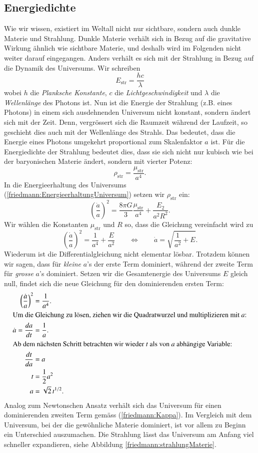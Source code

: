 \begin{refsection}
\subsection*{Energiedichte}
Wie wir wissen, existiert im Weltall nicht nur sichtbare, sondern auch dunkle Materie und Strahlung. Dunkle Materie verhält sich in Bezug auf die gravitative Wirkung ähnlich wie sichtbare Materie, und deshalb wird im Folgenden nicht weiter darauf eingegangen.
Anders verhält es sich mit der Strahlung in Bezug auf die Dynamik des Universums. Wir schreiben
\[ E_\text{str} = \frac{h c}{\lambda} \]
wobei $h$ die {\em Planksche Konstante}, $c$ die {\em Lichtgeschwindigkeit} und $\lambda$ die {\em Wellenlänge} des Photons ist.
Nun ist die Energie der Strahlung (z.B. eines Photons) in einem sich ausdehnenden Universum nicht konstant, sondern ändert sich mit der Zeit. 
Denn, vergrössert sich die Raumzeit während der Laufzeit, so geschieht dies auch mit der Wellenlänge des Strahls. Das bedeutet, dass die Energie eines Photons umgekehrt proportional zum Skalenfaktor $a$ ist. Für die Energiedichte der Strahlung bedeutet dies, dass sie sich nicht nur kubisch wie bei der baryonischen Materie ändert, sondern mit vierter Potenz:
\begin{equation}
\rho_\text{str} = \frac{\mu_{\text{str}}}{a^4}.
\end{equation}
In die Energieerhaltung des Universums (\ref{friedmann:EnergieerhaltungUniversum}) setzen wir $\rho_\text{str}$ ein:
\[\left(\frac{\dot{a}}{a} \right)^2 = \frac{8 \pi G}{3} \frac{\mu_{\text{str}}}{a^4} + \frac{E_2}{a^2 R^2}.\]
Wir wählen die Konstanten $\mu_{\text{str}}$ und $R$ so, dass die Gleichung vereinfacht wird zu
\[\left(\frac{\dot{a}}{a} \right)^2 = \frac{1}{a^4} + \frac{E}{a^2} \qquad \Leftrightarrow \qquad\dot{a} = \sqrt{\frac{1}{a^2} + E}.\]
Wiederum ist die Differentialgleichung nicht elementar lösbar. Trotzdem können wir sagen, dass für {\em kleine} $a$'s der erste Term dominiert, während der zweite Term für {\em grosse} $a$'s dominiert. Setzen wir die Gesamtenergie des Universums $E$ gleich null, findet sich die neue Gleichung für den dominierenden ersten Term:
\begin{align}
	\nonumber\left(\frac{\dot{a}}{a} \right)^2 &= \frac{1}{a^4}.\\
	\intertext{Um die Gleichung zu lösen, ziehen wir die Quadratwurzel und multiplizieren mit $a$:}
	\nonumber\dot{a} = \frac{da}{dt} &=\frac{1}{a}.\\
	\intertext{Ab dem nächsten Schritt betrachten wir wieder $t$ als von $a$ abhängige Variable:}
	\nonumber\frac{dt}{da} &= a\\
	\nonumber t &= \frac{1}{2} a^{2}\\
	a &= \sqrt{2}\,t^{1/2}. 
\end{align}
Analog zum Newtonschen Ansatz verhält sich das Universum für einen dominierenden zweiten Term gemäss (\ref{friedmann:Kappa}). 
Im Vergleich mit dem Universum, bei der die gewöhnliche Materie dominiert, ist vor allem zu Beginn ein Unterschied auszumachen. Die Strahlung lässt das Universum am Anfang viel schneller expandieren, siehe Abbildung \ref{friedmann:strahlungMaterie}. 


\end{refsection}
